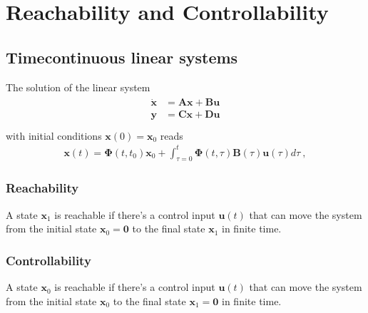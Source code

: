 \documentclass[letterpaper,10pt,english]{jupyterBook}
\begin{document}
\chapter{Reachability and Controllability}
\label{\detokenize{ch/system-theory/controllability-reachability:reachability-and-controllability}}\label{\detokenize{ch/system-theory/controllability-reachability:controllability-reachability}}\label{\detokenize{ch/system-theory/controllability-reachability::doc}}

\section{Time\sphinxhyphen{}continuous linear systems}
\label{\detokenize{ch/system-theory/controllability-reachability:time-continuous-linear-systems}}\label{\detokenize{ch/system-theory/controllability-reachability:controllability-reachability-time-continuous}}
\sphinxAtStartPar
The solution of the linear system
\begin{equation*}
\begin{split}\begin{aligned}
  \dot{\mathbf{x}} & = \mathbf{A} \mathbf{x} + \mathbf{B} \mathbf{u} \\
       \mathbf{y}  & = \mathbf{C} \mathbf{x} + \mathbf{D} \mathbf{u} \\
\end{aligned}\end{split}
\end{equation*}
\sphinxAtStartPar
with initial conditions \(\mathbf{x}(0) = \mathbf{x}_0\) reads
\begin{equation*}
\begin{split}\mathbf{x}(t) = \boldsymbol\Phi(t,t_0) \mathbf{x}_0 + \int_{\tau=0}^{t} \boldsymbol\Phi(t,\tau) \mathbf{B}(\tau) \mathbf{u}(\tau) d \tau \ ,\end{split}
\end{equation*}

\subsection{Reachability}
\label{\detokenize{ch/system-theory/controllability-reachability:reachability}}
\sphinxAtStartPar
A state \(\mathbf{x}_1\) is reachable if there’s a control input \(\mathbf{u}(t)\) that can move the system from the initial state \(\mathbf{x}_0 = \mathbf{0}\) to the final state \(\mathbf{x}_1\) in finite time.


\subsection{Controllability}
\label{\detokenize{ch/system-theory/controllability-reachability:controllability}}
\sphinxAtStartPar
A state \(\mathbf{x}_0\) is reachable if there’s a control input \(\mathbf{u}(t)\) that can move the system from the initial state \(\mathbf{x}_0\) to the final state \(\mathbf{x}_1 = \mathbf{0}\) in finite time.
\end{document}
